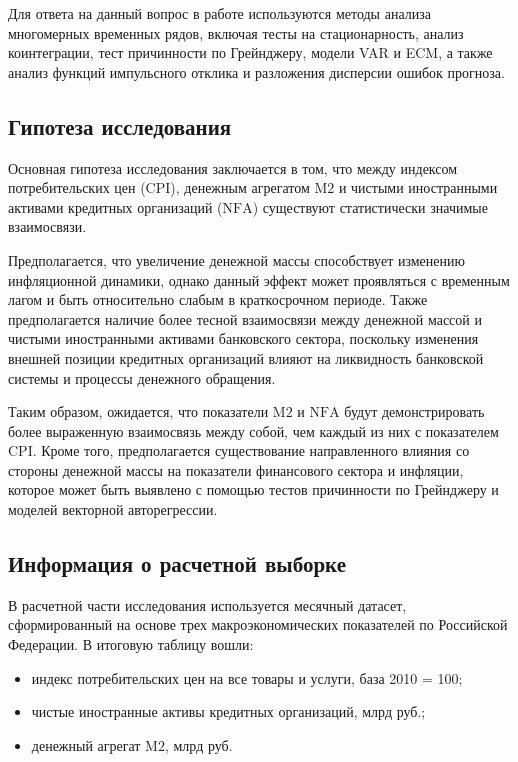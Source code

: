 \documentclass[12pt,a4paper]{article}
\begin{document}
Для ответа на данный вопрос в работе используются методы анализа многомерных временных
рядов, включая тесты на стационарность, анализ коинтеграции, тест причинности по Грейнджеру,
модели VAR и ECM, а также анализ функций импульсного отклика и разложения дисперсии ошибок
прогноза.

\subsection{Гипотеза исследования}
Основная гипотеза исследования заключается в том, что между индексом потребительских цен
($\mathrm{CPI}$), денежным агрегатом $\mathrm{M2}$ и чистыми иностранными активами кредитных организаций
($\mathrm{NFA}$) существуют статистически значимые взаимосвязи.

Предполагается, что увеличение денежной массы способствует изменению инфляционной динамики,
однако данный эффект может проявляться с временным лагом и быть относительно слабым в
краткосрочном периоде. Также предполагается наличие более тесной взаимосвязи между денежной
массой и чистыми иностранными активами банковского сектора, поскольку изменения внешней
позиции кредитных организаций влияют на ликвидность банковской системы и процессы денежного
обращения.

Таким образом, ожидается, что показатели $\mathrm{M2}$ и $\mathrm{NFA}$ будут демонстрировать более
выраженную взаимосвязь между собой, чем каждый из них с показателем $\mathrm{CPI}$. Кроме того,
предполагается существование направленного влияния со стороны денежной массы на показатели
финансового сектора и инфляции, которое может быть выявлено с помощью тестов причинности по
Грейнджеру и моделей векторной авторегрессии.

\subsection{Информация о расчетной выборке}
В расчетной части исследования используется месячный датасет, сформированный на основе трех
макроэкономических показателей по Российской Федерации. В итоговую таблицу вошли:
\begin{itemize}
\item индекс потребительских цен на все товары и услуги, база 2010 = 100;
\item чистые иностранные активы кредитных организаций, млрд руб.;
\item денежный агрегат $\mathrm{M2}$, млрд руб.
\end{itemize}
\end{document}
